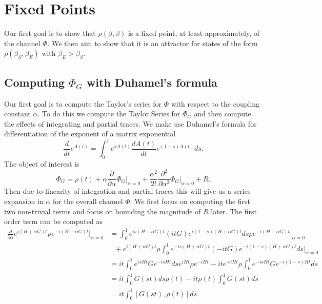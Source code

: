 \documentclass{article}
\begin{document}
\section{Fixed Points}
Our first goal is to show that $\rho(\beta, \beta)$ is a fixed point, at least approximately, of the channel $\Phi$. We then aim to show that it is an attractor for states of the form $\rho(\beta_S, \beta_E)$ with $\beta_E > \beta_S$. 

\subsection{Computing $\Phi_G$ with Duhamel's formula}
Our first goal is to compute the Taylor's series for $\Phi$ with respect to the coupling constant $\alpha$. To do this we compute the Taylor Series for $\Phi_G$ and then compute the effects of integrating and partial traces. We make use Duhamel's formula for differentiation of the exponent of a matrix exponential
\begin{equation}
    \frac{d}{dt} e^{A(t)} = \int_0^1 e^{s A(t)} \frac{d A(t)}{dt} e^{(1-s)A(t)} ds.
\end{equation}
The object of interest is $$\Phi_G = \rho(t) + \alpha \frac{\partial}{\partial \alpha} \Phi_G \big|_{\alpha=0} + \frac{\alpha^2}{2!} \frac{\partial^2}{\partial \alpha^2} \Phi_G \big|_{\alpha=0} + R.$$ Then due to linearity of integration and partial traces this will give us a series expansion in $\alpha$ for the overall channel $\Phi$. We first focus on computing the first two non-trivial terms and focus on bounding the magnitude of $R$ later. 
The first order term can be computed as
\begin{align}
    \frac{\partial}{\partial \alpha} e^{i(H+\alpha G)t} \rho e^{-i (H+\alpha G)t} \bigg|_{\alpha = 0} &= \int_{0}^{1} e^{i s (H+\alpha G)t} (i t G) e^{i (1-s) (H+\alpha G)t} ds \rho e^{-i(H+\alpha G)t} \bigg|_{\alpha=0} \nonumber \\
    &\text{ } + e^{i(H+\alpha G)t} \rho \int_{0}^1 e^{-i s (H+\alpha G) t} (- i t G) e^{-i (1-s) (H+\alpha G)t} ds \bigg|_{\alpha = 0} \label{eq:first_order_alpha_derivative}\\
    &= i t \int_0^1 e^{i s H t} G e^{-i s H t} ds e^{i H t} \rho e^{-i H t} - i t e^{+i H t} \rho \int_0^1 e^{-is H t} G e^{-i(1-s) Ht} ds \\
    &= i t \int_0^1 G(s t) ds \rho(t) - it \rho(t) \int_0^1 G(s t) ds \\
    &= i t \int_0^1 [G(s t), \rho(t)] ds.
\end{align}
\end{document}

